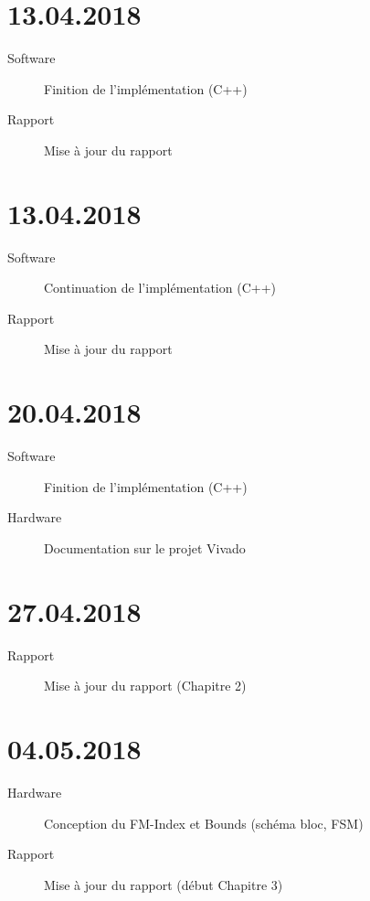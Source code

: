 \section*{13.04.2018}

\begin{description}
	\item [Software] Finition de l'implémentation (C++)
	\item [Rapport] Mise à jour du rapport
\end{description}

\section*{13.04.2018}

\begin{description}
	\item [Software] Continuation de l'implémentation (C++)
	\item [Rapport] Mise à jour du rapport
\end{description}

\section*{20.04.2018}

\begin{description}
	\item [Software] Finition de l'implémentation (C++)
	\item [Hardware] Documentation sur le projet Vivado
\end{description}

\section*{27.04.2018}

\begin{description}
\item [Rapport] Mise à jour du rapport (Chapitre 2)
\end{description}

\section*{04.05.2018}

\begin{description}
	\item [Hardware] Conception du FM-Index et Bounds (schéma bloc, FSM)
	\item [Rapport] Mise à jour du rapport (début Chapitre 3)
\end{description}

